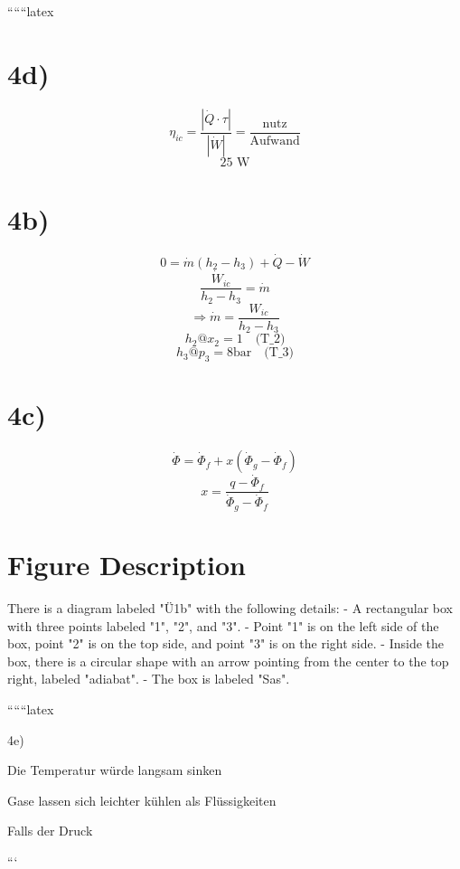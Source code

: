 ``````latex

\section*{4d)}
\[
\eta_{ic} = \frac{|\dot{Q} \cdot \tau|}{|\dot{W}|} = \frac{\text{nutz}}{\text{Aufwand}}
\]
\[
\text{25 W}
\]

\section*{4b)}
\[
0 = \dot{m} (h_2 - h_3) + \dot{Q} - \dot{W}
\]
\[
\frac{\dot{W}_{ic}}{h_2 - h_3} = \dot{m}
\]
\[
\Rightarrow \dot{m} = \frac{W_{ic}}{h_2 - h_3}
\]
\[
h_2 @ x_2 = 1 \quad \text{(T_2)}
\]
\[
h_3 @ p_3 = 8 \text{bar} \quad \text{(T_3)}
\]

\section*{4c)}
\[
\dot{\Phi} = \dot{\Phi}_f + x (\dot{\Phi}_g - \dot{\Phi}_f)
\]
\[
x = \frac{q - \dot{\Phi}_f}{\dot{\Phi}_g - \dot{\Phi}_f}
\]

\section*{Figure Description}
There is a diagram labeled "Ü1b" with the following details:
- A rectangular box with three points labeled "1", "2", and "3".
- Point "1" is on the left side of the box, point "2" is on the top side, and point "3" is on the right side.
- Inside the box, there is a circular shape with an arrow pointing from the center to the top right, labeled "adiabat".
- The box is labeled "Sas".

``````latex


4e)

Die Temperatur würde langsam sinken

Gase lassen sich leichter kühlen als Flüssigkeiten

Falls der Druck

```